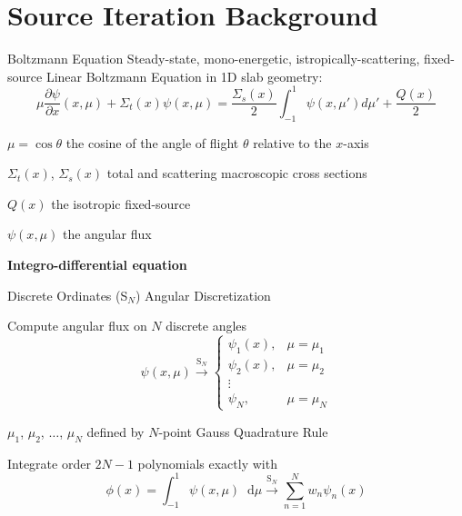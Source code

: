 \documentclass[10pt]{beamer}
\newcommand{\SN}{S$_N$\xspace}
\newcommand{\ud}{\mathop{}\!\mathrm{d}} %
\newcommand{\pderiv}[2]{\frac{\partial #1}{\partial #2}}
\begin{document}
\section{Source Iteration Background}

\begin{frame}{Boltzmann Equation}
    Steady-state, mono-energetic, istropically-scattering, fixed-source \alert{Linear Boltzmann Equation} in 1D slab geometry:
    \begin{equation*}
        \mu \pderiv{\psi}{x}(x, \mu) + \Sigma_t(x) \psi(x,\mu) = 
        \frac{\Sigma_s(x)}{2} \int_{-1}^{1} \psi(x, \mu') d\mu' + \frac{Q(x)}{2}
    \end{equation*}

    $\mu = \cos \theta$ the cosine of the angle of flight $\theta$ relative to the $x$-axis

    $\Sigma_t(x)$, $\Sigma_s(x)$ total and scattering macroscopic cross sections 

    $Q(x)$ the isotropic fixed-source

    $\psi(x,\mu)$ the angular flux 


    \vfill
    \centerline{\textbf{Integro-differential equation}}

\end{frame}

\begin{frame}{Discrete Ordinates (\SN) Angular Discretization}

    Compute angular flux on $N$ discrete angles
    \begin{equation*}
        \psi(x,\mu) \xrightarrow{\text{S}_N} 
        \begin{cases}
            \psi_1(x), & \mu = \mu_1 \\ 
            \psi_2(x), & \mu = \mu_2 \\ 
            \vdots \\ 
            \psi_N, & \mu = \mu_N 
        \end{cases}
    \end{equation*}

    \pause
    $\mu_1$, $\mu_2$, $\dots$, $\mu_N$ defined by $N$-point Gauss Quadrature Rule 

    \pause
    Integrate order $2N-1$ polynomials exactly with 
    \begin{equation*}
        \phi(x) = \int_{-1}^1 \psi(x, \mu) \ud\mu 
            \xrightarrow{\text{S}_N} \sum_{n=1}^N 
            w_n \psi_n(x)
    \end{equation*}

\end{frame}
\end{document}
